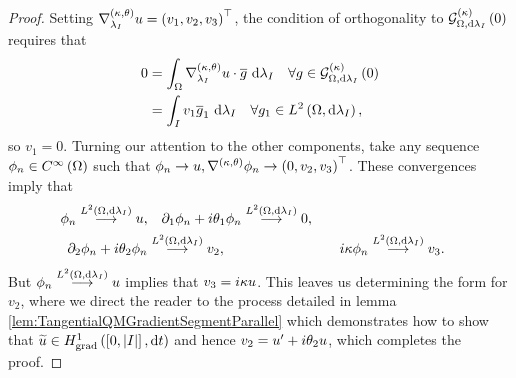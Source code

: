 \begin{proof}
	Setting $\nabla^{\left( \kappa, \theta \right)}_{\lambda_I}u = \left( v_1,v_2,v_3 \right)^{\top}$, the condition of orthogonality to $\mathcal{G}_{ \Omega, \mathrm{d}\lambda_I}^{(\kappa)}\left( 0 \right)$ requires that
	\begin{align*}
		0 &= \int_{\Omega}\nabla^{\left( \kappa, \theta \right)}_{\lambda_I}u \cdot \overline{g} \ \mathrm{d}\lambda_I \quad \forall g\in\mathcal{G}_{ \Omega, \mathrm{d}\lambda_I}^{(\kappa)}\left( 0 \right) \\
		&= \int_{I}v_1 \overline{g}_1 \ \mathrm{d}\lambda_{I} \quad \forall g_1\in L^{2}\left( \Omega,\mathrm{d}\lambda_I \right),
	\end{align*}
	so $v_1=0$.
	Turning our attention to the other components, take any sequence $\phi_n\in C^{\infty}\left( \Omega \right)$ such that $\phi_n\rightarrow u, \nabla^{\left( \kappa, \theta \right)}\phi_n\rightarrow \left( 0,v_2,v_3 \right)^\top$.
	These convergences imply that
	\begin{align*}
		\phi_n \overset{L^{2}\left( \Omega,\mathrm{d}\lambda_I \right)}{\longrightarrow} u, 
		&\quad \partial_1\phi_n + i\theta_1 \phi_n \overset{L^{2}\left( \Omega,\mathrm{d}\lambda_I \right)}{\longrightarrow} 0, \\
		\partial_2\phi_n + i\theta_2 \phi_n &\overset{L^{2}\left( \Omega,\mathrm{d}\lambda_I \right)}{\longrightarrow} v_2, 
		&\quad i\kappa\phi_n &\overset{L^{2}\left( \Omega,\mathrm{d}\lambda_I \right)}{\longrightarrow} v_3.
	\end{align*}
	But $\phi_n \overset{L^{2}\left( \Omega,\mathrm{d}\lambda_I \right)}{\longrightarrow} u$ implies that $v_3 = i\kappa u$.
	This leaves us determining the form for $v_2$, where we direct the reader to the process detailed in lemma \ref{lem:TangentialQMGradientSegmentParallel} which demonstrates how to show that $\widetilde{u}\in H^1_\mathrm{grad}\left( \left[ 0,\left\lvert I \right\rvert \right], \mathrm{d}t \right)$ and hence $v_2 = u' + i\theta_2 u$, which completes the proof.
\end{proof}

